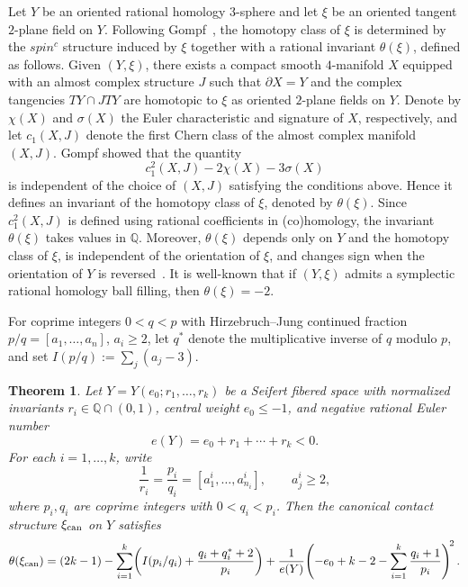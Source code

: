 \documentclass[11pt]{amsart}
\theoremstyle{plain}
\newtheorem{theorem}{Theorem}[section]
\theoremstyle{definition}
\theoremstyle{remark}
\newcommand{\Q}{\mathbb{Q}}
\begin{document}
Let $Y$ be an oriented rational homology $3$-sphere and let $\xi$ be
an oriented tangent $2$-plane field on $Y$. Following
Gompf~\cite{Gompf98}, the homotopy class of $\xi$ is determined by the
$spin^c$ structure induced by $\xi$ together with a rational invariant
$\theta(\xi)$, defined as follows. Given $(Y,\xi)$, there exists a
compact smooth $4$-manifold $X$ equipped with an almost complex
structure $J$ such that $\partial X=Y$ and the complex tangencies
$TY\cap JTY$ are homotopic to $\xi$ as oriented $2$-plane fields on
$Y$. Denote by $\chi(X)$ and $\sigma(X)$ the Euler characteristic and
signature of $X$, respectively, and let $c_1(X,J)$ denote the first
Chern class of the almost complex manifold $(X,J)$. Gompf showed that
the quantity
\[
c_1^2(X,J)-2\chi(X)-3\sigma(X)
\]
is independent of the choice of $(X,J)$ satisfying the conditions
above. Hence it defines an invariant of the homotopy class of $\xi$,
denoted by $\theta(\xi)$. Since $c_1^2(X,J)$ is defined using rational
coefficients in (co)homology, the invariant $\theta(\xi)$ takes
values in $\Q$. Moreover, $\theta(\xi)$ depends only on $Y$ and the
homotopy class of $\xi$, is independent of the orientation of $\xi$,
and changes sign when the orientation of $Y$ is
reversed~\cite[Theorem~4.5]{Gompf98}. It is well-known that if
$(Y,\xi)$ admits a symplectic rational homology ball filling, then
$\theta(\xi)=-2$.

For coprime integers $0<q<p$ with Hirzebruch--Jung continued fraction
$p/q=[a_1,\dots,a_n]$, $a_i\ge 2$, let $q^*$ denote the multiplicative
inverse of $q$ modulo $p$, and set $I(p/q):=\sum_j(a_j-3)$.

\begin{theorem}\label{thm:main-seifert}
Let $Y=Y(e_0;r_1,\dots,r_k)$ be a Seifert fibered space with
normalized invariants $r_i\in\Q\cap(0,1)$, central weight
$e_0\le -1$, and negative rational Euler number
\[
e(Y)=e_0+r_1+\cdots+r_k<0.
\]
For each $i=1,\dots,k$, write
\[
\frac{1}{r_i}=\frac{p_i}{q_i}=[a_1^i,\dots,a_{n_i}^i],
\qquad a_j^i\ge 2,
\]
where $p_i,q_i$ are coprime integers with $0<q_i<p_i$. Then the
canonical contact structure $\xi_{\rm can}$ on $Y$ satisfies
\[
\theta(\xi_{\rm can})
=
(2k-1)
-\sum_{i=1}^k\!\left(I(p_i/q_i)+\frac{q_i+q_i^*+2}{p_i}\right)
+\frac{1}{e(Y)}\!\left(-e_0+k-2-\sum_{i=1}^k\frac{q_i+1}{p_i}\right)^{\!2}.
\]
\end{theorem}
\end{document}

